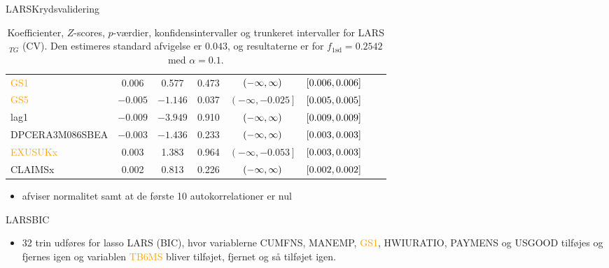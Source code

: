 \begin{frame}{LARS}{Krydsvalidering}
\begin{table}[ht]
{\begin{tabular}{lccccccc}
\textcolor{orange}{GS1} &   0.006&   0.577    &0.473  &    $\del{-\infty  ,  \infty}$  &$\sbr{0.006 ,0.006}$ \\  
\textcolor{orange}{GS5} & $-0.005$ & $-1.146 $ &0.037 &     $\left( -\infty ,  -0.025\right]   $ & $\sbr{0.005 ,0.005 }$\\  
 \textcolor{blue3}{lag1}  & $-0.009$  &$-3.949$   & 0.910   & $\del{-\infty  ,  \infty }$  &$\sbr{0.009, 0.009 }$ \\ 
 \textcolor{red3}{DPCERA3M086SBEA} & $- 0.003$ & $-1.436$ & 0.233  &   $\del{-\infty   ,  \infty }$ &  $\sbr{0.003, 0.003}$ \\ 
\textcolor{orange}{ EXUSUKx}  &  0.003   &1.383 & 0.964   &   $\left( -\infty     ,-0.053 \right] $&  $\sbr{0.003, 0.003 }$   \\   
 \textcolor{blue3}{CLAIMSx} &0.002 &  0.813   & 0.226 &    $\del{-\infty  ,  \infty}$& $\sbr{0.002 ,0.002 }$   \\ 
\bottomrule
\end{tabular}  
}
\caption{Koefficienter, \(Z\)-scores, \(p\)-værdier, konfidensintervaller og trunkeret intervaller for LARS$_{TG}$ (CV). Den estimeres standard afvigelse er \(0.043\), og resultaterne er for \(f_{1 \text{sd}} = 0.2542\) med \(\alpha = 0.1\).} \label{tab:larInf_kryds}
\end{table} 
\begin{itemize}
\item afviser normalitet samt at de første 10 autokorrelationer er nul
\end{itemize}
\end{frame}


\begin{frame}{LARS}{BIC}
\begin{table}
\center
{}
\caption{Værdien af $f_\text{BIC}$, antallet af parametre, BIC, justeret R$^2$  og log-likelihood for LARS og lasso LARS.} \label{tab:bic_lars}
\end{table}
\begin{itemize}
\item 32 trin udføres for lasso LARS (BIC), hvor variablerne \textcolor{chartreuse4}{CUMFNS}, \textcolor{blue3}{MANEMP}, \textcolor{orange}{GS1}, \textcolor{blue3}{HWIURATIO}, \textcolor{blue3}{PAYMENS} og \textcolor{blue3}{USGOOD} tilføjes og fjernes igen og variablen \textcolor{orange}{TB6MS} bliver tilføjet, fjernet og så tilføjet igen. 
\end{itemize}
\end{frame}

